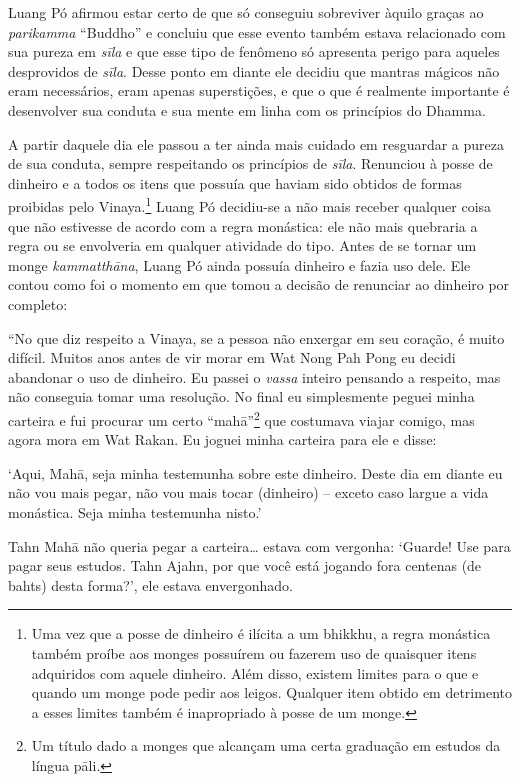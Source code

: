 Luang Pó afirmou estar certo de que só conseguiu sobreviver àquilo
graças ao \emph{parikamma} ``Buddho'' e concluiu que esse evento também
estava relacionado com sua pureza em \emph{sīla} e que esse tipo de
fenômeno só apresenta perigo para aqueles desprovidos de \emph{sīla}.
Desse ponto em diante ele decidiu que mantras mágicos não eram
necessários, eram apenas superstições, e que o que é realmente
importante é desenvolver sua conduta e sua mente em linha com os
princípios do Dhamma.

A partir daquele dia ele passou a ter ainda mais cuidado em resguardar a
pureza de sua conduta, sempre respeitando os princípios de \emph{sīla}.
Renunciou à posse de dinheiro e a todos os itens que possuía que haviam
sido obtidos de formas proibidas pelo Vinaya.\footnote{Uma vez que a
  posse de dinheiro é ilícita a um bhikkhu, a regra monástica também
  proíbe aos monges possuírem ou fazerem uso de quaisquer itens
  adquiridos com aquele dinheiro. Além disso, existem limites para o que
  e quando um monge pode pedir aos leigos. Qualquer item obtido em
  detrimento a esses limites também é inapropriado à posse de um monge.}
Luang Pó decidiu-se a não mais receber qualquer coisa que não estivesse
de acordo com a regra monástica: ele não mais quebraria a regra ou se
envolveria em qualquer atividade do tipo. Antes de se tornar um monge
\emph{kammatthāna}, Luang Pó ainda possuía dinheiro e fazia uso dele.
Ele contou como foi o momento em que tomou a decisão de renunciar ao
dinheiro por completo:

``No que diz respeito a Vinaya, se a pessoa não enxergar em seu coração,
é muito difícil. Muitos anos antes de vir morar em Wat Nong Pah Pong eu
decidi abandonar o uso de dinheiro. Eu passei o \emph{vassa} inteiro
pensando a respeito, mas não conseguia tomar uma resolução. No final eu
simplesmente peguei minha carteira e fui procurar um certo
``mahā''\footnote{Um título dado a monges que alcançam uma certa
  graduação em estudos da língua pāli.} que costumava viajar comigo, mas
agora mora em Wat Rakan. Eu joguei minha carteira para ele e disse:

`Aqui, Mahā, seja minha testemunha sobre este dinheiro. Deste dia em
diante eu não vou mais pegar, não vou mais tocar (dinheiro) -- exceto
caso largue a vida monástica. Seja minha testemunha nisto.'

Tahn Mahā não queria pegar a carteira\ldots{} estava com vergonha:
`Guarde! Use para pagar seus estudos. Tahn Ajahn, por que você está
jogando fora centenas (de bahts) desta forma?', ele estava envergonhado.


